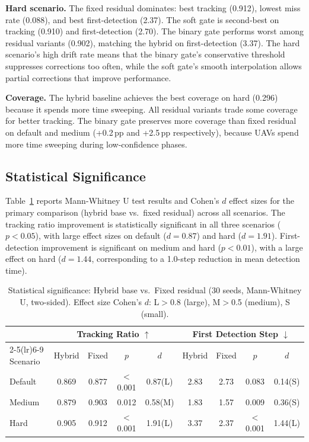 \documentclass[journal]{IEEEtran}
\begin{document}
\textbf{Hard scenario.} The fixed residual dominates: best tracking (0.912), lowest
miss rate (0.088), and best first-detection (2.37). The soft gate is second-best on
tracking (0.910) and first-detection (2.70). The binary gate performs worst among
residual variants (0.902), matching the hybrid on first-detection (3.37). The hard
scenario's high drift rate means that the binary gate's conservative threshold
suppresses corrections too often, while the soft gate's smooth interpolation allows
partial corrections that improve performance.

\textbf{Coverage.} The hybrid baseline achieves the best coverage on hard (0.296)
because it spends more time sweeping. All residual variants trade some coverage for
better tracking. The binary gate preserves more coverage than fixed residual on
default and medium (+0.2\,pp and +2.5\,pp respectively), because UAVs spend more
time sweeping during low-confidence phases.

\subsection{Statistical Significance}
\label{sec:significance}

Table~\ref{tab:significance} reports Mann-Whitney U test results and Cohen's $d$
effect sizes for the primary comparison (hybrid base vs.\ fixed residual) across
all scenarios. The tracking ratio improvement is statistically significant in all
three scenarios ($p < 0.05$), with large effect sizes on default ($d=0.87$) and
hard ($d=1.91$). First-detection improvement is significant on medium and hard
($p < 0.01$), with a large effect on hard ($d=1.44$, corresponding to a 1.0-step
reduction in mean detection time).

\begin{table}[t]
\centering
\caption{Statistical significance: Hybrid base vs.\ Fixed residual (30 seeds, Mann-Whitney U, two-sided).
Effect size Cohen's $d$: L$>$0.8 (large), M$>$0.5 (medium), S (small).}
\label{tab:significance}
\scriptsize
\setlength{\tabcolsep}{4pt}
\begin{tabular}{@{}lcccccccc@{}}
\toprule
 & \multicolumn{4}{c}{Tracking Ratio $\uparrow$} & \multicolumn{4}{c}{First Detection Step $\downarrow$} \\
\cmidrule(lr){2-5}\cmidrule(lr){6-9}
Scenario & Hybrid & Fixed & $p$ & $d$ & Hybrid & Fixed & $p$ & $d$ \\
\midrule
Default & 0.869 & 0.877 & $<$0.001 & 0.87(L) & 2.83 & 2.73 & 0.083 & 0.14(S) \\
Medium  & 0.879 & 0.903 & 0.012    & 0.58(M) & 1.83 & 1.57 & 0.009 & 0.36(S) \\
Hard    & 0.905 & 0.912 & $<$0.001 & 1.91(L) & 3.37 & 2.37 & $<$0.001 & 1.44(L) \\
\bottomrule
\end{tabular}
\end{table}
\end{document}
